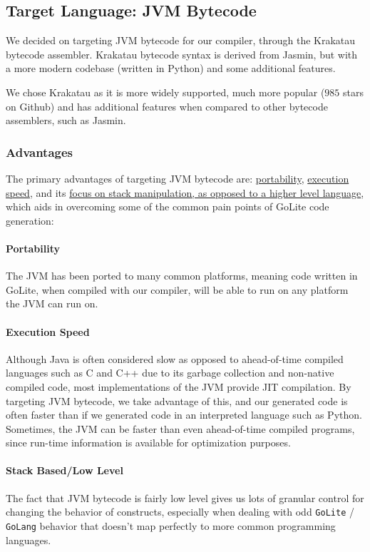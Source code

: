 \documentclass[11pt]{article}
\begin{document}
\subsection{Target Language: JVM Bytecode}
We decided on targeting JVM bytecode for our compiler, through the
Krakatau\cite{krakatau} bytecode assembler. Krakatau bytecode syntax
is derived from Jasmin, but with a more modern codebase (written in
Python) and some additional features.

We chose Krakatau as it is more widely supported, much more popular
($985$ stars on Github\cite{krakatau}) and has additional features
when compared to other bytecode assemblers, such as Jasmin.
\subsubsection{Advantages}
The primary advantages of targeting JVM bytecode are:
\hyperref[sec:portability]{portability},
\hyperref[sec:execs]{execution speed}, and its
\hyperref[sec:stack]{focus on stack manipulation, as opposed to a
  higher level language}, which aids in overcoming some of the common
pain points of GoLite code generation:
\paragraph{Portability}%
\label{sec:portability}
The JVM has been ported to many common platforms, meaning code written
in GoLite, when compiled with our compiler, will be able to run on any
platform the JVM can run on.
\paragraph{Execution Speed}%
\label{sec:execs}
Although Java is often considered slow as opposed to ahead-of-time
compiled languages such as C and C++ due to its garbage collection and
non-native compiled code, most implementations of the JVM provide JIT
compilation. By targeting JVM bytecode, we take advantage of this, and
our generated code is often faster than if we generated code in an
interpreted language such as Python. Sometimes, the JVM can be faster
than even ahead-of-time compiled programs, since run-time information
is available for optimization purposes.
\paragraph{Stack Based/Low Level}%
\label{sec:stack}
The fact that JVM bytecode is fairly low level gives us lots of
granular control for changing the behavior of constructs, especially
when dealing with odd \texttt{GoLite} / \texttt{GoLang} behavior that
doesn't map perfectly to more common programming languages.
\end{document}
